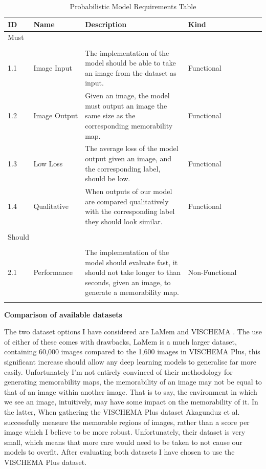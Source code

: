 \documentclass{UoYCSproject}
\begin{document}
\begin{table}[h]
    \begin{tabular}{p{0.1\linewidth} p{0.2\linewidth} p{0.4\linewidth} p{0.3\linewidth}}
    \toprule
    ID & Name & Description & Kind \\ \midrule
    \multicolumn{4}{l}{{Must}} \\
    \hline \\
    1.1 & Image Input & The implementation of the model should be able to take an image from the dataset as input. & Functional \\
    1.2 & Image Output & Given an image, the model must output an image the same size as the corresponding memorability map. & Functional \\
    1.3 & Low Loss & The average loss of the model output given an image, and the corresponding label, should be low. & Functional \\
    1.4 & Qualitative & When outputs of our model are compared qualitatively with the corresponding label they should look similar. & Functional \\
    \hline \\
    \multicolumn{4}{l}{{Should}} \\
    \hline \\
    2.1 & Performance & The implementation of the model should evaluate fast, it should not take longer to than seconds, given an image, to generate a memorability map. & Non-Functional \\
     &  &  &  \\ \bottomrule
    \end{tabular}
    \caption{Probabilistic Model Requirements Table}
    \label{tab:RequirementCaptureTable}
\end{table}

\textbf{Comparison of available datasets}

The two dataset options I have considered are LaMem \cite{ICCV15_Khosla} and VISCHEMA \cite{VischemaPaper}. The use of either of these comes with drawbacks, LaMem is a much larger dataset, containing 60,000 images compared to the 1,600 images in VISCHEMA Plus, this significant increase should allow any deep learning models to generalise far more easily. Unfortunately I'm not entirely convinced of their methodology for generating memorability maps, the memorability of an image may not be equal to that of an image within another image. That is to say, the environment in which we see an image, intuitively, may have some impact on the memorability of it. In the latter, 
When gathering the VISCHEMA Plus dataset  Akagunduz et al. successfully measure the memorable regions of images, rather than a score per image which I believe to be more robust. Unfortunately, their dataset is very small, which means that more care would need to be taken to not cause our models to overfit. After evaluating both datasets I have chosen to use the VISCHEMA Plus dataset. 
\end{document}

